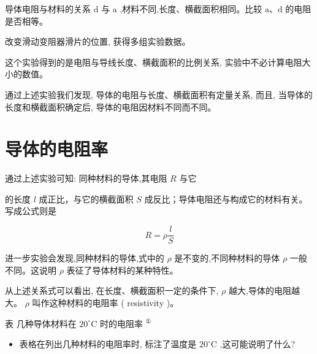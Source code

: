 \documentclass[10pt]{article}
\begin{document}
导体电阻与材料的关系 \(\mathrm{d}\) 与 \(\mathrm{a}\) ,材料不同,长度、横截面积相同。比较 \(\mathrm{a}\text{、}\mathrm{d}\) 的电阻是否相等。

改变滑动变阻器滑片的位置, 获得多组实验数据。

这个实验得到的是电阻与导线长度、横截面积的比例关系, 实验中不必计算电阻大小的数值。

通过上述实验我们发现, 导体的电阻与长度、横截面积有定量关系, 而且, 当导体的长度和横截面积确定后, 导体的电阻因材料不同而不同。

\section*{导体的电阻率}

通过上述实验可知: 同种材料的导体,其电阻 \(R\) 与它

的长度 \(l\) 成正比，与它的横截面积 \(S\) 成反比；导体电阻还与构成它的材料有关。写成公式则是

\[
R = \rho \frac{l}{S}
\]

进一步实验会发现,同种材料的导体,式中的 \(\rho\) 是不变的,不同种材料的导体 \(\rho\) 一般不同。这说明 \(\rho\) 表征了导体材料的某种特性。

从上述关系式可以看出, 在长度、横截面积一定的条件下, \(\rho\) 越大,导体的电阻越大。 \(\rho\) 叫作这种材料的电阻率 ( resistivity )。

表 几种导体材料在 \({20}^{ \circ }\mathrm{C}\) 时的电阻率 \({}^{\text{①}}\)

\begin{center}
\end{center}

\begin{mdframed}

\begin{itemize}
\item 表格在列出几种材料的电阻率时, 标注了温度是 \({20}^{ \circ }\mathrm{C}\) ,这可能说明了什么?
\end{itemize}

\end{mdframed}
\end{document}
